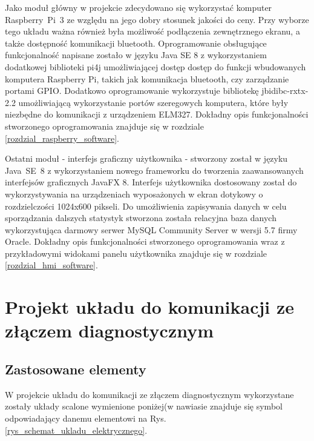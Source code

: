 \documentclass[12pt]{article} %
\numberwithin{equation}{subsection}
\numberwithin{figure}{section}
\numberwithin{table}{section}
\begin{document}
	\newpage
	
	Jako moduł główny w projekcie zdecydowano się wykorzystać komputer \mbox{Raspberry Pi 3} ze względu na jego dobry stosunek jakości do ceny. Przy wyborze tego układu ważna również była możliwość podłączenia zewnętrznego ekranu, a także dostępność komunikacji bluetooth. Oprogramowanie obsługujące funkcjonalność napisane zostało w języku Java SE 8 z wykorzystaniem dodatkowej biblioteki pi4j umożliwiającej dostęp dostęp do funkcji wbudowanych komputera Raspberry Pi, takich jak komunikacja bluetooth, czy zarządzanie portami GPIO. Dodatkowo oprogramowanie wykorzystuje bibliotekę jbidibc-rxtx-2.2 umożliwiającą wykorzystanie portów szeregowych komputera, które były niezbędne do komunikacji z urządzeniem ELM327. Dokładny opis funkcjonalności stworzonego oprogramowania znajduje się w rozdziale \ref{rozdzial_raspberry_software}.
	
	Ostatni moduł - interfejs graficzny użytkownika - stworzony został w języku \mbox{Java SE 8} z wykorzystaniem nowego frameworku do tworzenia zaawansowanych interfejsów graficznych JavaFX 8. Interfejs użytkownika dostosowany został do wykorzystywania na urządzeniach wyposażonych w ekran dotykowy o rozdzielczości 1024x600 pikseli. Do umożliwienia zapisywania danych w celu sporządzania dalszych statystyk stworzona została relacyjna baza danych wykorzystująca darmowy serwer MySQL Community Server w wersji 5.7 firmy Oracle. Dokładny opis funkcjonalności stworzonego oprogramowania wraz z przykładowymi widokami panelu użytkownika znajduje się w rozdziale \ref{rozdzial_hmi_software}.
	
	
	
	\newpage	
	
\section{Projekt układu do komunikacji ze złączem diagnostycznym} \label{rozdzial_uklad_stm}
	\subsection{Zastosowane elementy}W projekcie układu do komunikacji ze złączem diagnostycznym wykorzystane zostały układy scalone wymienione poniżej(w nawiasie znajduje się symbol odpowiadający danemu elementowi na Rys. \ref{rys_schemat_ukladu_elektrycznego}.
	
\end{document}

